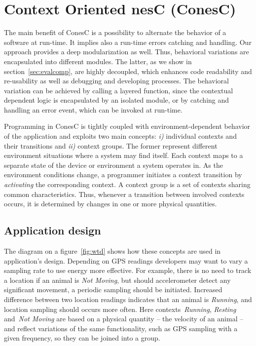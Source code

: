 \section{Context Oriented nesC (ConesC)} 

The main benefit of ConesC is a possibility to alternate the behavior of a software at
run-time. It implies also a run-time errors catching and handling. Our approach
provides a deep modularization as well. Thus, behavioral variations are encapsulated
into different modules. The latter, as we show in section~\ref{sec:evalcomp},
are highly decoupled, which enhances code readability and re-usability as well as debugging
and developing processes. The behavioral variation can be achieved by calling a
layered function, since the contextual dependent logic is encapsulated by an isolated module, or
by catching and handling an error event, which can be invoked at run-time.

Programming in ConesC is tightly coupled with environment-dependent behavior of
the application and exploits two main concepts: \emph{i)} individual contexts
and their transitions and \emph{ii)} context groups. The former represent
different environment situations where a system may find itself. Each context
maps to a separate state of the device or environment a system operates in. As
the environment conditions change, a programmer initiates a context transition
by \emph{activating} the corresponding context. A context group is a set of contexts
sharing common characteristics. Thus, whenever a transition between involved
contexts occurs, it is determined by changes in one or more physical quantities.

\subsection{Application design}

The diagram on a figure~\ref{fig:wtd} shows how these concepts are used in application's design.
Depending on GPS readings developers may want to vary a sampling rate to use energy
more effective. For example, there is no need to
track a location if an animal is \emph{Not Moving}, but should accelerometer detect any
significant movement, a periodic sampling should be initiated. Increased
difference between two location readings indicates that an animal is
\emph{Running}, and location sampling should occurs more often.
Here contexts~\emph{Running}, \emph{Resting} and~\emph{Not Moving} are based on
a physical quantity -- the velocity of an animal -- and reflect
variations of the same functionality, such as GPS sampling with a given frequency,
so they can be joined into a group.

